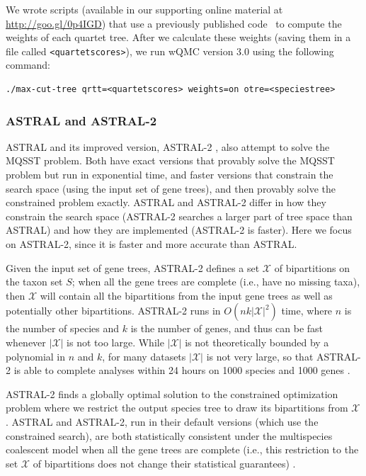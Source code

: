 We wrote scripts (available in our supporting online  material at \url{http://goo.gl/0p4IGD})
that use a previously published code~\cite{JohansenThesis}
to compute the weights of each quartet tree.
After we calculate these weights (saving them in a 
file called {\tt <quartetscores>}),
we run wQMC version 3.0 using the following command:
\begin{verbatim}
./max-cut-tree qrtt=<quartetscores> weights=on otre=<speciestree>
\end{verbatim}

\subsubsection{ASTRAL and ASTRAL-2}
ASTRAL \cite{ASTRAL} and 
its improved version, 
ASTRAL-2 \cite{ASTRAL2}, 
also attempt to solve the MQSST problem.
Both have exact versions that provably solve the
MQSST problem but run in exponential time, and faster
versions that constrain the search space (using the input
set of gene trees), and then provably solve the
constrained problem exactly.
ASTRAL and ASTRAL-2 differ in
how they constrain the search space (ASTRAL-2 searches
a larger part of tree space than ASTRAL)  and how
they are implemented (ASTRAL-2 is faster). 
Here we focus on ASTRAL-2, since it is faster
and more accurate than ASTRAL. 

Given
the input set of gene trees, ASTRAL-2 defines a set $\mathcal{X}$ of
bipartitions on the taxon set $S$; when all the gene trees are
complete (i.e., have no missing taxa), then $\mathcal{X}$ will 
contain all the bipartitions from the input gene trees as well as potentially
other
bipartitions.
ASTRAL-2 runs in $O(n k |\mathcal{X}|^2)$ time, where
$n$ is the number of species and $k$ is the number of genes, and thus
can be fast whenever $|\mathcal{X}|$ is not too large.
While $|\mathcal{X}|$ is not theoretically bounded by
a polynomial in $n$ and $k$, 
for many datasets $|\mathcal{X}|$ is
not very large, so that
ASTRAL-2 is able to complete analyses 
within 24 hours  on 
1000 species and 1000 genes \cite{ASTRAL2}.

ASTRAL-2
finds a globally optimal solution to the constrained optimization problem
where we restrict the output species tree to draw its bipartitions
from $\mathcal{X}$. 
ASTRAL and ASTRAL-2, run in their default versions (which
use the constrained search),  are both
statistically consistent under the multispecies
coalescent model when all the gene trees are complete (i.e.,  this restriction
to the set $\mathcal{X}$ of bipartitions does not change
their statistical guarantees) \cite{ASTRAL2}.

